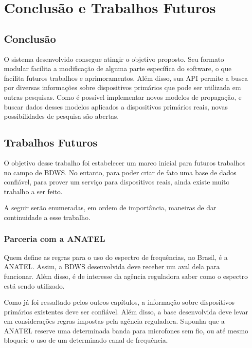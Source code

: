 \chapter{Conclusão e Trabalhos Futuros}

\section{Conclusão}

	O sistema desenvolvido consegue atingir o objetivo proposto. Seu formato modular facilita a modificação de alguma parte específica do software, o que facilita futuros trabalhos e aprimoramentos. Além disso, sua API permite a busca por diversas informações sobre dispositivos primários que pode ser utilizada em outras pesquisas. Como é possível implementar novos modelos de propagação, e buscar dados desses modelos aplicados a dispositivos primários reais, novas possibilidades de pesquisa são abertas.

\section{Trabalhos Futuros}

O objetivo desse trabalho foi estabelecer um marco inicial para futuros trabalhos no campo de BDWS. No entanto, para poder criar de fato uma base de dados confiável, para prover um serviço para dispositivos reais, ainda existe muito trabalho a ser feito. 

A seguir serão enumeradas, em ordem de importância, maneiras de dar continuidade a esse trabalho.

\subsection{Parceria com a ANATEL}

	Quem define as regras para o uso do espectro de frequências, no Brasil, é a ANATEL. Assim, a BDWS desenvolvida deve receber um aval dela para funcionar. Além disso, é de interesse da agência reguladora saber como o espectro está sendo utilizado. 

	Como já foi ressaltado pelos outros capítulos, a informação sobre dispositivos primários existentes deve ser confiável. Além disso, a base desenvolvida deve levar em considerações regras impostas pela agência reguladora. Suponha que a ANATEL reserve uma determinada banda para microfones sem fio, ou até mesmo bloqueie o uso de um determinado canal de frequência. 

